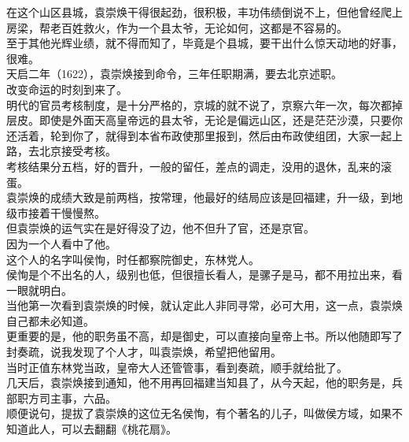\begin{multicols}{\theparacolNo}
在这个山区县城，袁崇焕干得很起劲，很积极，丰功伟绩倒说不上，但他曾经爬上房梁，帮老百姓救火，作为一个县太爷，无论如何，这都是不容易的。\\

至于其他光辉业绩，就不得而知了，毕竟是个县城，要干出什么惊天动地的好事，很难。\\

天启二年（1622），袁崇焕接到命令，三年任职期满，要去北京述职。\\

改变命运的时刻到来了。\\

明代的官员考核制度，是十分严格的，京城的就不说了，京察六年一次，每次都掉层皮。即使是外面天高皇帝远的县太爷，无论是偏远山区，还是茫茫沙漠，只要你还活着，轮到你了，就得到本省布政使那里报到，然后由布政使组团，大家一起上路，去北京接受考核。\\

考核结果分五档，好的晋升，一般的留任，差点的调走，没用的退休，乱来的滚蛋。\\

袁崇焕的成绩大致是前两档，按常理，他最好的结局应该是回福建，升一级，到地级市接着干慢慢熬。\\

但袁崇焕的运气实在是好得没了边，他不但升了官，还是京官。\\

因为一个人看中了他。\\

这个人的名字叫侯恂，时任都察院御史，东林党人。\\

侯恂是个不出名的人，级别也低，但很擅长看人，是骡子是马，都不用拉出来，看一眼就明白。\\

当他第一次看到袁崇焕的时候，就认定此人非同寻常，必可大用，这一点，袁崇焕自己都未必知道。\\

更重要的是，他的职务虽不高，却是御史，可以直接向皇帝上书。所以他随即写了封奏疏，说我发现了个人才，叫袁崇焕，希望把他留用。\\

当时正值东林党当政，皇帝大人还管管事，看到奏疏，顺手就给批了。\\

几天后，袁崇焕接到通知，他不用再回福建当知县了，从今天起，他的职务是，兵部职方司主事，六品。\\

顺便说句，提拔了袁崇焕的这位无名侯恂，有个著名的儿子，叫做侯方域，如果不知道此人，可以去翻翻《桃花扇》。\\


\end{multicols}
